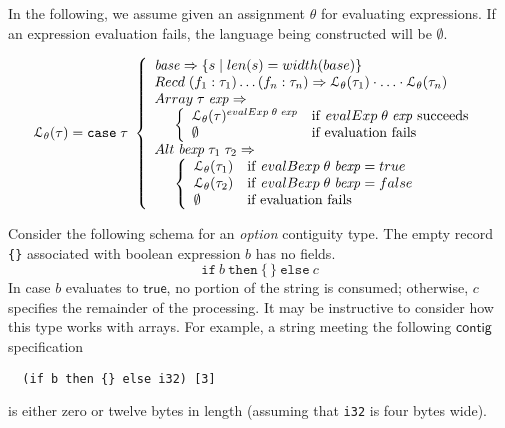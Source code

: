 \documentclass[a4paper,UKenglish,cleveref, autoref, thm-restate]{lipics-v2021}
\newcommand{\konst}[1]{\ensuremath{\mathsf{#1}}}
\newcommand{\set}[1]{\ensuremath{\{ {#1} \}}}
\newcommand{\LangTheta}[1]{\ensuremath{{\mathcal L}_{\theta}({#1})}}
\newcommand{\itelse}[3]{\mbox{$\mathtt{if}\ {#1}\ \mathtt{then}\ {#2}\ \mathtt{else}\ {#3}$}}
\begin{document}
\begin{definition}

 In the following, we assume given an assignment $\theta$ for
 evaluating expressions. If an expression evaluation fails, the
 language being constructed will be $\emptyset$.

\[
\LangTheta{\tau} =
\mathtt{case}\; \tau\
 \left\{
 \begin{array}{l}
 \mathit{base} \Rightarrow \set{s \mid \konst{len}(s) = \konst{width}(base)} \\
 \konst{Recd}\; (f_1 : \tau_1) \ldots (f_n : \tau_n)
      \Rightarrow \LangTheta{\tau_1} \cdot \ldots \cdot \LangTheta{\tau_n}
\\
 \konst{Array}\; \tau \; \mathit{exp} \Rightarrow  \\
  \hspace*{5mm}
 \left\{
 \begin{array}{ll}
    \LangTheta{\tau}^{\konst{evalExp}\;\theta\;\mathit{exp}} &
       \mathrm{if}\ \konst{evalExp}\;\theta\;\mathit{exp}\ \mathrm{succeeds} \\
    \emptyset & \text{if evaluation fails}
 \end{array}
 \right.
\\
 \konst{Alt}\; \mathit{bexp}\;\tau_1\; \tau_2 \Rightarrow \\
  \hspace*{5mm}
 \left\{
 \begin{array}{ll}
    \LangTheta{\tau_1} & \mathrm{if}\ \konst{evalBexp}\;\theta\;\mathit{bexp} = \konst{true} \\
    \LangTheta{\tau_2} & \mathrm{if}\ \konst{evalBexp}\;\theta\;\mathit{bexp} = \konst{false} \\
    \emptyset          & \text{if evaluation fails}
 \end{array}
 \right.
 \\
\end{array}
 \right.
\]
\end{definition}

\begin{example}
Consider the following schema for an \emph{option} contiguity
type. The empty record \verb+{}+ associated with boolean expression
$b$ has no fields.
\[ \itelse{b}{\{\,\}}{c} \]
In case $\mathit{b}$ evaluates to \konst{true}, no portion of the
string is consumed; otherwise, $c$ specifies the remainder of the
processing. It may be instructive to consider how this type works with
arrays. For example, a string meeting the following \konst{contig} specification

{\small
\begin{verbatim}
  (if b then {} else i32) [3]
\end{verbatim}
}

\noindent is either zero or twelve bytes in length (assuming that
\verb+i32+ is four bytes wide).

\end{example}
\end{document}
